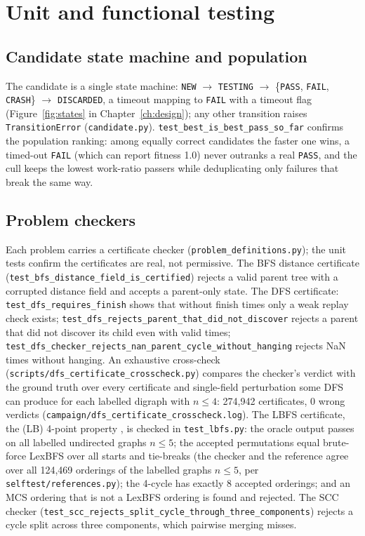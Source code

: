 \section{Unit and functional testing}
\label{sec:test-unit}

\subsection{Candidate state machine and population}

The candidate is a single state machine: \texttt{NEW} $\rightarrow$
\texttt{TESTING} $\rightarrow$ \{\texttt{PASS}, \texttt{FAIL},
\texttt{CRASH}\} $\rightarrow$ \texttt{DISCARDED}, a timeout mapping to
\texttt{FAIL} with a timeout flag (Figure~\ref{fig:states} in
Chapter~\ref{ch:design}); any other transition raises
\texttt{TransitionError} (\texttt{candidate.py}).
\texttt{test\_best\_is\_best\_pass\_so\_far} confirms the population ranking:
among equally correct candidates the faster one wins, a timed-out
\texttt{FAIL} (which can report fitness 1.0) never outranks a real
\texttt{PASS}, and the cull keeps the lowest work-ratio passers while
deduplicating only failures that break the same way.

\subsection{Problem checkers}

Each problem carries a certificate checker (\texttt{problem\_definitions.py});
the unit tests confirm the certificates are real, not permissive. The BFS
distance certificate (\texttt{test\_bfs\_distance\_field\_is\_certified})
rejects a valid parent tree with a corrupted distance field and accepts a
parent-only state. The DFS certificate: \texttt{test\_dfs\_requires\_finish}
shows that without finish times only a weak replay check exists;
\texttt{test\_dfs\_rejects\_parent\_that\_did\_not\_discover} rejects a parent
that did not discover its child even with valid times;
\texttt{test\_dfs\_checker\_rejects\_nan\_parent\_cycle\_without\_hanging}
rejects NaN times without hanging. An exhaustive cross-check
(\texttt{scripts/dfs\_certificate\_crosscheck.py}) compares the checker's
verdict with the ground truth over every certificate and single-field
perturbation some DFS can produce for each labelled digraph with $n \le 4$:
274{,}942 certificates, 0 wrong verdicts
(\texttt{campaign/dfs\_certificate\_crosscheck.log}).
The LBFS certificate, the (LB) 4-point property \citep{corneil2008unified}, is
checked in \texttt{test\_lbfs.py}: the oracle output passes on all labelled
undirected graphs $n \le 5$; the accepted permutations equal brute-force LexBFS
over all starts and tie-breaks (the checker and the reference agree over all
124{,}469 orderings of the labelled graphs $n \le 5$, per
\texttt{selftest/references.py}); the 4-cycle has exactly 8 accepted orderings;
and an MCS ordering that is not a LexBFS ordering is found and rejected. The
SCC checker (\texttt{test\_scc\_rejects\_split\_cycle\_through\_three\_components})
rejects a cycle split across three components, which pairwise merging misses.

